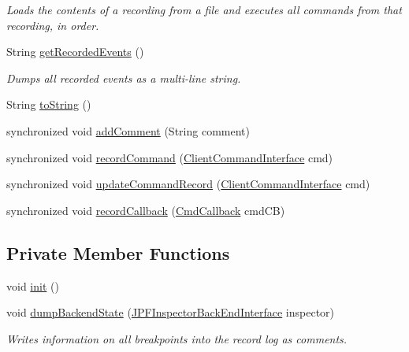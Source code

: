 \begin{DoxyCompactItemize}
\begin{DoxyCompactList}\small\item\em Loads the contents of a recording from a file and executes all commands from that recording, in order. \end{DoxyCompactList}\item 
String \hyperlink{classgov_1_1nasa_1_1jpf_1_1inspector_1_1client_1_1_command_recorder_aec025042d922d663c6f52d02319abbf2}{get\+Recorded\+Events} ()
\begin{DoxyCompactList}\small\item\em Dumps all recorded events as a multi-\/line string. \end{DoxyCompactList}\item 
String \hyperlink{classgov_1_1nasa_1_1jpf_1_1inspector_1_1client_1_1_command_recorder_a2a95403d5f3a4e9092a1f43095b174eb}{to\+String} ()
\item 
synchronized void \hyperlink{classgov_1_1nasa_1_1jpf_1_1inspector_1_1client_1_1_command_recorder_adee55e2460cc05a8acf16a7b0c89d3bd}{add\+Comment} (String comment)
\item 
synchronized void \hyperlink{classgov_1_1nasa_1_1jpf_1_1inspector_1_1client_1_1_command_recorder_af5f212124179773e46c8b45f1d01a32d}{record\+Command} (\hyperlink{interfacegov_1_1nasa_1_1jpf_1_1inspector_1_1client_1_1_client_command_interface}{Client\+Command\+Interface} cmd)
\item 
synchronized void \hyperlink{classgov_1_1nasa_1_1jpf_1_1inspector_1_1client_1_1_command_recorder_ade47a98956248efd0020281f2562f3a8}{update\+Command\+Record} (\hyperlink{interfacegov_1_1nasa_1_1jpf_1_1inspector_1_1client_1_1_client_command_interface}{Client\+Command\+Interface} cmd)
\item 
synchronized void \hyperlink{classgov_1_1nasa_1_1jpf_1_1inspector_1_1client_1_1_command_recorder_abe21b5a43baac419c36c34b5f35e2e50}{record\+Callback} (\hyperlink{classgov_1_1nasa_1_1jpf_1_1inspector_1_1client_1_1commands_1_1_cmd_callback}{Cmd\+Callback} cmd\+CB)
\end{DoxyCompactItemize}
\subsection*{Private Member Functions}
\begin{DoxyCompactItemize}
\item 
void \hyperlink{classgov_1_1nasa_1_1jpf_1_1inspector_1_1client_1_1_command_recorder_aa9226669d52ca21f47d5b4cb86ace336}{init} ()
\item 
void \hyperlink{classgov_1_1nasa_1_1jpf_1_1inspector_1_1client_1_1_command_recorder_adc15ac3933c1c031ff93f7dd0872369f}{dump\+Backend\+State} (\hyperlink{interfacegov_1_1nasa_1_1jpf_1_1inspector_1_1interfaces_1_1_j_p_f_inspector_back_end_interface}{J\+P\+F\+Inspector\+Back\+End\+Interface} inspector)
\begin{DoxyCompactList}\small\item\em Writes information on all breakpoints into the record log as comments. \end{DoxyCompactList}\end{DoxyCompactItemize}
